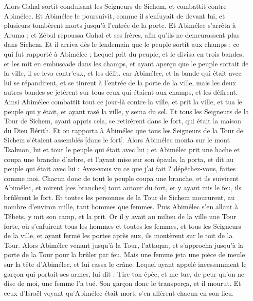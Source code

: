 \begin{multicols}{2}
Alors Gahal sortit conduisant les Seigneurs de Sichem, et combattit contre Abimélec.
Et Abimélec le poursuivit, comme il s'enfuyait de devant lui, et plusieurs tombèrent morts jusqu'à l'entrée de la porte.
Et Abimélec s'arrêta à Aruma ; et Zébul repoussa Gahal et ses frères, afin qu'ils ne demeurassent plus dans Sichem.
Et il arriva dès le lendemain que le peuple sortit aux champs ; ce qui fut rapporté à Abimélec ;
Lequel prit du peuple, et le divisa en trois bandes, et les mit en embuscade dans les champs, et ayant aperçu que le peuple sortait de la ville, il se leva contr'eux, et les défit.
car Abimélec, et la bande qui était avec lui se répandirent, et se tinrent à l'entrée de la porte de la ville, mais les deux autres bandes se jetèrent sur tous ceux qui étaient aux champs, et les défirent.
Ainsi Abimélec combattit tout ce jour-là contre la ville, et prit la ville, et tua le peuple qui y était, et ayant rasé la ville, y sema du sel.
Et tous les Seigneurs de la Tour de Sichem, ayant appris cela, se retirèrent dans le fort, qui était la maison du Dieu Bérith.
Et on rapporta à Abimélec que tous les Seigneurs de la Tour de Sichem s'étaient assemblés [dans le fort].
Alors Abimélec monta sur le mont Tsalmon, lui et tout le peuple qui était avec lui ; et Abimélec prit une hache et coupa une branche d'arbre, et l'ayant mise sur son épaule, la porta, et dit au peuple qui était avec lui : Avez-vous vu ce que j'ai fait ? dépêchez-vous, faites comme moi.
Chacun donc de tout le peuple coupa une branche, et ils suivirent Abimélec, et mirent [ces branches] tout autour du fort, et y ayant mis le feu, ils brûlèrent le fort. Et toutes les personnes de la Tour de Sichem moururent, au nombre d'environ mille, tant hommes que femmes.
Puis Abimélec s'en allant à Tébets, y mit son camp, et la prit.
Or il y avait au milieu de la ville une Tour forte, où s'enfuirent tous les hommes et toutes les femmes, et tous les Seigneurs de la ville, et ayant fermé les portes après eux, ils montèrent sur le toit de la Tour.
Alors Abimélec venant jusqu'à la Tour, l'attaqua, et s'approcha jusqu'à la porte de la Tour pour la brûler par feu.
Mais une femme jeta une pièce de meule sur la tête d'Abimélec, et lui cassa le crâne.
Lequel ayant appelé incessamment le garçon qui portait ses armes, lui dit : Tire ton épée, et me tue, de peur qu'on ne dise de moi, une femme l'a tué. Son garçon donc le transperça, et il mourut.
Et ceux d'Israël voyant qu'Abimélec était mort, s'en allèrent chacun en son lieu.

\end{multicols}
